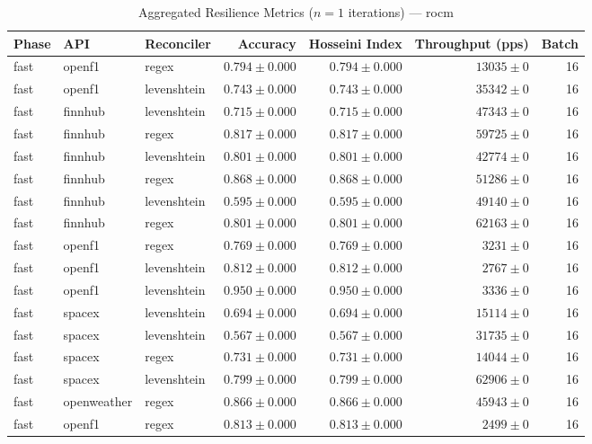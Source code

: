 
\begin{table}[htbp]
\caption{Aggregated Resilience Metrics ($n=1$ iterations) --- rocm}
\begin{tabular}{l l l r r r r}
\hline
Phase & API & Reconciler & Accuracy & Hosseini Index & Throughput (pps) & Batch \\
\hline
fast & openf1 & regex & $0.794\pm0.000$ & $0.794\pm0.000$ & $13035\pm0$ & 16 \\
fast & openf1 & levenshtein & $0.743\pm0.000$ & $0.743\pm0.000$ & $35342\pm0$ & 16 \\
fast & finnhub & levenshtein & $0.715\pm0.000$ & $0.715\pm0.000$ & $47343\pm0$ & 16 \\
fast & finnhub & regex & $0.817\pm0.000$ & $0.817\pm0.000$ & $59725\pm0$ & 16 \\
fast & finnhub & levenshtein & $0.801\pm0.000$ & $0.801\pm0.000$ & $42774\pm0$ & 16 \\
fast & finnhub & regex & $0.868\pm0.000$ & $0.868\pm0.000$ & $51286\pm0$ & 16 \\
fast & finnhub & levenshtein & $0.595\pm0.000$ & $0.595\pm0.000$ & $49140\pm0$ & 16 \\
fast & finnhub & regex & $0.801\pm0.000$ & $0.801\pm0.000$ & $62163\pm0$ & 16 \\
fast & openf1 & regex & $0.769\pm0.000$ & $0.769\pm0.000$ & $3231\pm0$ & 16 \\
fast & openf1 & levenshtein & $0.812\pm0.000$ & $0.812\pm0.000$ & $2767\pm0$ & 16 \\
fast & openf1 & levenshtein & $0.950\pm0.000$ & $0.950\pm0.000$ & $3336\pm0$ & 16 \\
fast & spacex & levenshtein & $0.694\pm0.000$ & $0.694\pm0.000$ & $15114\pm0$ & 16 \\
fast & spacex & levenshtein & $0.567\pm0.000$ & $0.567\pm0.000$ & $31735\pm0$ & 16 \\
fast & spacex & regex & $0.731\pm0.000$ & $0.731\pm0.000$ & $14044\pm0$ & 16 \\
fast & spacex & levenshtein & $0.799\pm0.000$ & $0.799\pm0.000$ & $62906\pm0$ & 16 \\
fast & openweather & regex & $0.866\pm0.000$ & $0.866\pm0.000$ & $45943\pm0$ & 16 \\
fast & openf1 & regex & $0.813\pm0.000$ & $0.813\pm0.000$ & $2499\pm0$ & 16 \\

\end{tabular}
\end{table}
